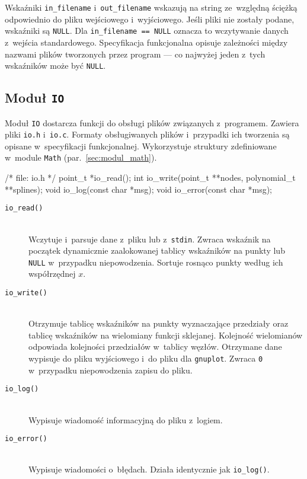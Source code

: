 \documentclass[10pt,a4paper]{article}
\newcommand{\p}[1]{\texttt{#1}}
\begin{document}
Wskaźniki \p{in\_filename} i~\p{out\_filename} wskazują na string ze~względną
ściężką odpowiednio do pliku wejściowego i~wyjściowego. Jeśli pliki nie
zostały podane, wskaźniki są \p{NULL}. Dla \p{in\_filename == NULL} oznacza to
wczytywanie danych z~wejścia standardowego. Specyfikacja funkcjonalna opisuje
zależności między nazwami plików tworzonych przez program --- co najwyżej jeden
z~tych wskaźników może być \p{NULL}.

\subsection{Moduł \p{IO}}

Moduł \p{IO} dostarcza funkcji do obsługi plików związanych z~programem.
Zawiera pliki \p{io.h} i~\p{io.c}. Formaty obsługiwanych plików i~przypadki ich
tworzenia są opisane w~specyfikacji funkcjonalnej. Wykorzystuje struktury
zdefiniowane w~module \p{Math} (par.~\ref{sec:modul_math}).
\begin{SmallVerbatim}
    /* file: io.h */
    point_t *io_read();
    int io_write(point_t **nodes, polynomial_t **splines);
    void io_log(const char *msg);
    void io_error(const char *msg);
\end{SmallVerbatim}
\begin{description}
  \item[\p{io\_read()}] \hfill \\
    Wczytuje i~parsuje dane z~pliku lub z~\p{stdin}. Zwraca wskaźnik na
    początek dynamicznie zaalokowanej tablicy wskaźników na punkty lub \p{NULL}
    w~przypadku niepowodzenia. Sortuje rosnąco punkty według ich współrzędnej
    $x$.
  \item[\p{io\_write()}] \hfill \\
    Otrzymuje tablicę wskaźników na punkty wyznaczające przedziały oraz tablicę
    wskaźników na wielomiany funkcji sklejanej. Kolejność wielomianów odpowiada
    kolejności przedziałów w~tablicy węzłów. Otrzymane dane wypisuje do pliku
    wyjściowego i~do pliku dla \p{gnuplot}. Zwraca \p{0} w~przypadku
    niepowodzenia zapisu do pliku.
  \item[\p{io\_log()}] \hfill \\
    Wypisuje wiadomość informacyjną do pliku z~logiem.
  \item[\p{io\_error()}] \hfill \\
    Wypisuje wiadomości o~błędach. Działa identycznie jak \p{io\_log()}.
\end{description}
\end{document}
